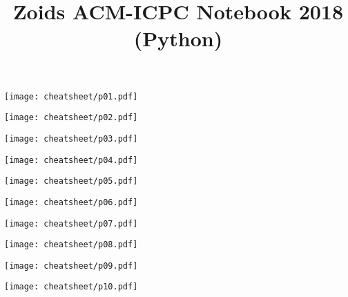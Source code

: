 \documentclass[10pt]{article}
\title{\vspace{-4ex}\Large{Zoids ACM-ICPC Notebook 2018 (Python)}}
\author{}
\date{}
\begin{document}
\begin{landscape}
\begin{multicols}{2}

\maketitle
\vspace{-13ex}
\tableofcontents
\pagestyle{fancy}



\end{multicols}
\end{landscape}

\centerline{\texttt{[image: cheatsheet/p01.pdf]}}
\centerline{\texttt{[image: cheatsheet/p02.pdf]}}
\centerline{\texttt{[image: cheatsheet/p03.pdf]}}
\centerline{\texttt{[image: cheatsheet/p04.pdf]}}
\centerline{\texttt{[image: cheatsheet/p05.pdf]}}
\centerline{\texttt{[image: cheatsheet/p06.pdf]}}
\centerline{\texttt{[image: cheatsheet/p07.pdf]}}
\centerline{\texttt{[image: cheatsheet/p08.pdf]}}
\centerline{\texttt{[image: cheatsheet/p09.pdf]}}
\centerline{\texttt{[image: cheatsheet/p10.pdf]}}

\newpage
\null
\newpage
\null
\newpage
\null
\end{document}
